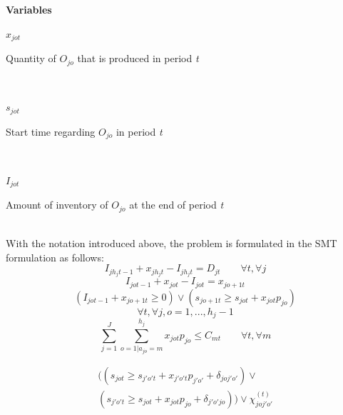 \documentclass[letterpaper]{article} %
\begin{document}
\noindent\textbf{Variables}\\
\parbox{30pt}{\textit{$x_{jot}$}} 
\parbox[t]{207pt}{Quantity of $O_{jo}$ that is produced in period \textit{t}}\\
\parbox{30pt}{\textit{$s_{jot}$}} 
\parbox[t]{207pt}{Start time regarding $O_{jo}$ in period \textit{t}}\\
\parbox{30pt}{\textit{$I_{jot}$}} 
\parbox[t]{207pt}{Amount of inventory of $O_{jo}$ at the end of period \textit{t}}\\

With the notation introduced above, the problem is formulated in the SMT formulation  as follows:
\begin{equation}
I_{j h_j t-1}+x_{j h_j t} - I_{j h_j t} = D_{jt} \quad\quad  \forall t, \forall j
\end{equation}
\begin{equation}
I_{j o t-1}+x_{j o t} - I_{j o t} = x_{j o+1 t}
\end{equation}
\begin{equation}
(I_{j o t-1}+x_{j o+1 t} \geq 0) \vee  (s_{j o+1 t} \geq s_{jot}+x_{jot}p_{jo})
\end{equation}
$$\forall t, \forall j,o=1,...,h_{j}-1$$
\begin{equation}
\sum_{j=1}^{J} \sum_{o=1|a_{jo}=m}^{h_{j}} x_{j o t} p_{jo} \leq C_{mt} \quad\quad  \forall t, \forall m
\end{equation}

\begin{multline}
\Big( (s_{jot} \geq s_{j'o't} + x_{j'o't} p_{j'o'}+ \delta_{joj'o'}) \vee
\\
(s_{j'o't}\geq s_{jot} + x_{jot} p_{jo} + \delta_{j'o'jo}) \Big)\vee\chi_{joj'o'}^{(t)}
\end{multline}
\end{document}
